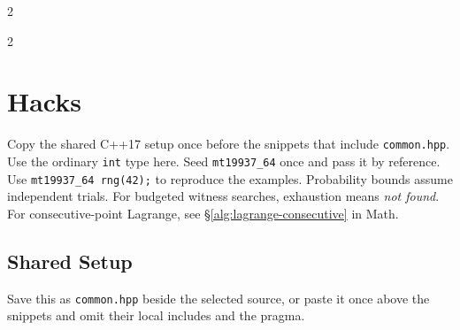 \documentclass[a4paper,landscape]{article}
\newcommand{\newnotebooksection}[1]{%
\setlength{\maxbalancingoverflow}{0pt}%
\end{multicols}%
\clearpage
\begin{multicols}{2}%
\section{#1}%
}
\begin{document}
\begin{multicols}{2}
\newnotebooksection{Hacks}
Copy the shared C++17 setup once before the snippets that include
\texttt{common.hpp}. Use the ordinary \texttt{int} type here. Seed
\texttt{mt19937\_64} once and pass it by reference. Use
\texttt{mt19937\_64 rng(42);} to reproduce the examples. Probability bounds
assume independent trials. For budgeted witness searches, exhaustion means
\emph{not found}. For consecutive-point Lagrange, see
\S\ref{alg:lagrange-consecutive} in Math.

\subsection{Shared Setup}
Save this as \texttt{common.hpp} beside the selected source, or paste it
once above the snippets and omit their local includes and the pragma.



\end{multicols}
\end{document}
